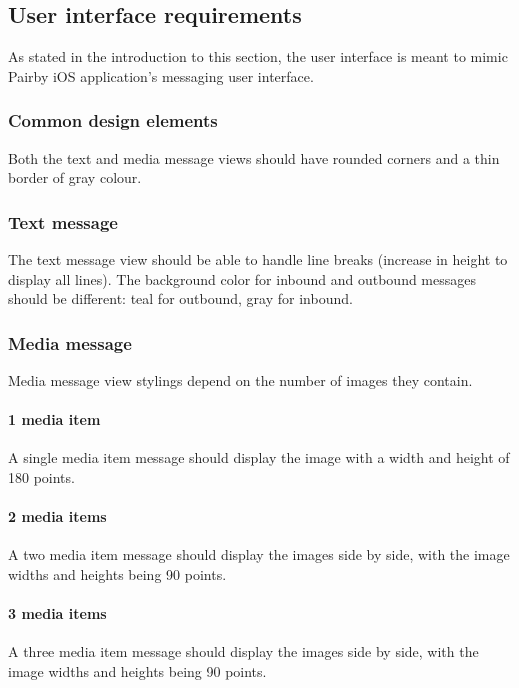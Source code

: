\documentclass[a4paper,12pt]{article}
\begin{document}
\subsection{User interface requirements}
As stated in the introduction to this section, the user interface is meant to mimic Pairby iOS application's messaging user interface.

\subsubsection*{Common design elements}
Both the text and media message views should have rounded corners and a thin border of gray colour.

\subsubsection*{Text message}
The text message view should be able to handle line breaks (increase in height to display all lines). The background color for inbound and outbound messages should be different: teal for outbound, gray for inbound.

\subsubsection*{Media message}
Media message view stylings depend on the number of images they contain.

\paragraph*{1 media item}
A single media item message should display the image with a width and height of 180 points.

\paragraph*{2 media items}
A two media item message should display the images side by side, with the image widths and heights being 90 points.

\paragraph*{3 media items}
A three media item message should display the images side by side, with the image widths and heights being 90 points.

\newpage
\end{document}
